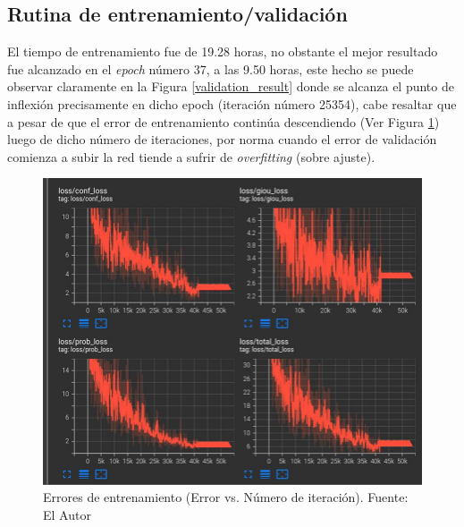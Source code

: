 \subsection{Rutina de entrenamiento/validación}
El tiempo de entrenamiento fue de 19.28 horas, no obstante el mejor resultado fue alcanzado en el \textit{epoch} número 37, a las 9.50 horas, este hecho se puede observar claramente en la Figura \ref{validation_result} donde se alcanza el punto de inflexión precisamente en dicho epoch (iteración número 25354), cabe resaltar que a pesar de que el error de entrenamiento continúa descendiendo (Ver Figura \ref{training_result}) luego de dicho número de iteraciones, por norma cuando el error de validación comienza a subir la red tiende a sufrir de \textit{overfitting} (sobre ajuste).
\begin{figure}[H]
    \centering
    \includegraphics[scale=0.4]{Recursos/training_loss_result.jpg}
    \caption[Errores de entrenamiento (Error vs. Número de iteración).]{Errores de entrenamiento (Error vs. Número de iteración). {\footnotesize Fuente: El Autor}}
    \label{training_result}
\end{figure}
